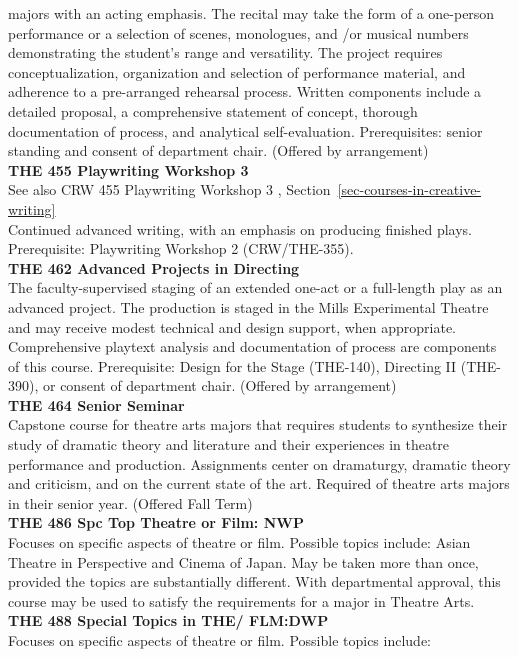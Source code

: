 \documentclass[
  letterpaper,
]{scrbook}
\begin{document}
majors with an acting emphasis. The recital may take the form of a
one-person performance or a selection of scenes, monologues, and /or
musical numbers demonstrating the student's range and versatility. The
project requires conceptualization, organization and selection of
performance material, and adherence to a pre-arranged rehearsal process.
Written components include a detailed proposal, a comprehensive
statement of concept, thorough documentation of process, and analytical
self-evaluation. Prerequisites: senior standing and consent of
department chair. (Offered by arrangement)\\
\textbf{THE 455 Playwriting Workshop 3}\\
See also CRW 455 Playwriting Workshop 3 ,
Section~\ref{sec-courses-in-creative-writing}\\
Continued advanced writing, with an emphasis on producing finished
plays. Prerequisite: Playwriting Workshop 2 (CRW/THE-355).\\
\textbf{THE 462 Advanced Projects in Directing}\\
The faculty-supervised staging of an extended one-act or a full-length
play as an advanced project. The production is staged in the Mills
Experimental Theatre and may receive modest technical and design
support, when appropriate. Comprehensive playtext analysis and
documentation of process are components of this course. Prerequisite:
Design for the Stage (THE-140), Directing II (THE-390), or consent of
department chair. (Offered by arrangement)\\
\textbf{THE 464 Senior Seminar}\\
Capstone course for theatre arts majors that requires students to
synthesize their study of dramatic theory and literature and their
experiences in theatre performance and production. Assignments center on
dramaturgy, dramatic theory and criticism, and on the current state of
the art. Required of theatre arts majors in their senior year. (Offered
Fall Term)\\
\textbf{THE 486 Spc Top Theatre or Film: NWP}\\
Focuses on specific aspects of theatre or film. Possible topics include:
Asian Theatre in Perspective and Cinema of Japan. May be taken more than
once, provided the topics are substantially different. With departmental
approval, this course may be used to satisfy the requirements for a
major in Theatre Arts.\\
\textbf{THE 488 Special Topics in THE/ FLM:DWP}\\
Focuses on specific aspects of theatre or film. Possible topics include:
\end{document}
